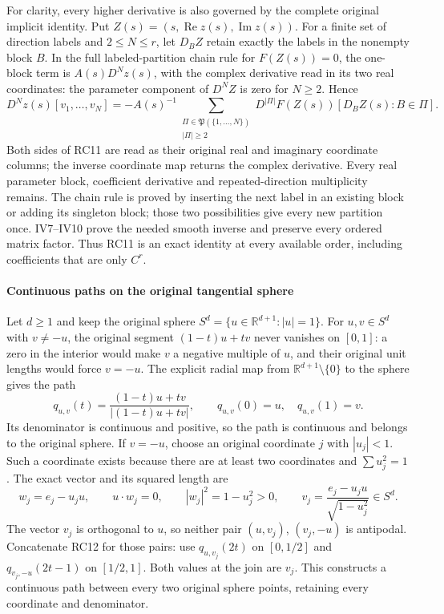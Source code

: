 \documentclass[
  11pt,
]{article}
\begin{document}
For clarity, every higher derivative is also governed by the complete
original implicit identity. Put
\(Z(s)=(s,\operatorname{Re}z(s),\operatorname{Im}z(s))\). For a finite
set of direction labels and \(2\leq N\leq r\), let \(D_BZ\) retain
exactly the labels in the nonempty block \(B\). In the full
labeled-partition chain rule for \(F(Z(s))=0\), the one-block term is
\(A(s)D^Nz(s)\), with the complex derivative read in its two real
coordinates: the parameter component of \(D^NZ\) is zero for \(N\geq2\).
Hence \[
 D^Nz(s)[v_1,\ldots,v_N]
 =-A(s)^{-1}
  \sum_{\substack{\Pi\in\mathfrak P(\{1,\ldots,N\})\\|\Pi|\geq2}}
    D^{|\Pi|}F(Z(s))[D_BZ(s):B\in\Pi].
 \tag{RC11}
\] Both sides of RC11 are read as their original real and imaginary
coordinate columns; the inverse coordinate map returns the complex
derivative. Every real parameter block, coefficient derivative and
repeated-direction multiplicity remains. The chain rule is proved by
inserting the next label in an existing block or adding its singleton
block; those two possibilities give every new partition once. IV7--IV10
prove the needed smooth inverse and preserve every ordered matrix
factor. Thus RC11 is an exact identity at every available order,
including coefficients that are only \(C^r\).

\paragraph{Continuous paths on the original tangential
sphere}\label{continuous-paths-on-the-original-tangential-sphere}

Let \(d\geq1\) and keep the original sphere
\(S^d=\{u\in\mathbb R^{d+1}:|u|=1\}\). For \(u,v\in S^d\) with
\(v\ne-u\), the original segment \((1-t)u+tv\) never vanishes on
\([0,1]\): a zero in the interior would make \(v\) a negative multiple
of \(u\), and their original unit lengths would force \(v=-u\). The
explicit radial map from \(\mathbb R^{d+1}\setminus\{0\}\) to the sphere
gives the path \[
 q_{u,v}(t)=\frac{(1-t)u+tv}{|(1-t)u+tv|},\qquad
 q_{u,v}(0)=u,\quad q_{u,v}(1)=v.
 \tag{RC12}
\] Its denominator is continuous and positive, so the path is continuous
and belongs to the original sphere. If \(v=-u\), choose an original
coordinate \(j\) with \(|u_j|<1\). Such a coordinate exists because
there are at least two coordinates and \(\sum u_j^2=1\). The exact
vector and its squared length are \[
 w_j=e_j-u_ju,\qquad u\cdot w_j=0,\qquad
 |w_j|^2=1-u_j^2>0,\qquad
 v_j=\frac{e_j-u_ju}{\sqrt{1-u_j^2}}\in S^d.
 \tag{RC13}
\] The vector \(v_j\) is orthogonal to \(u\), so neither pair
\((u,v_j)\), \((v_j,-u)\) is antipodal. Concatenate RC12 for those
pairs: use \(q_{u,v_j}(2t)\) on \([0,1/2]\) and \(q_{v_j,-u}(2t-1)\) on
\([1/2,1]\). Both values at the join are \(v_j\). This constructs a
continuous path between every two original sphere points, retaining
every coordinate and denominator.
\end{document}
